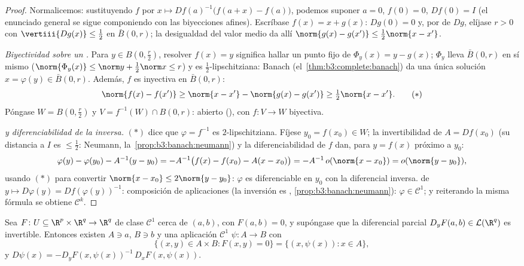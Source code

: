 \begin{proof}
Normalicemos: sustituyendo $f$ por $x \mapsto Df(a)^{-1}\bigl(f(a +
x) - f(a)\bigr)$, podemos suponer $a = 0$, $f(0) = 0$, $Df(0) =
I$ (el enunciado general se sigue componiendo con las biyecciones
afines). Escríbase $f(x) = x + g(x)$: $Dg(0) = 0$ y, por
 de $Dg$, elíjase
$r > 0$ con $\vertiii{Dg(x)} \leq \frac12$ en $\bar B(0, r)$; la
desigualdad del valor medio da allí $\norm{g(x) - g(x')} \leq \frac12
\norm{x - x'}$.

\emph{Biyectividad sobre un .}
Para $y \in B(0,
\frac r2)$, resolver $f(x) = y$ significa hallar un punto fijo de
$\Phi_y(x) = y - g(x)$; $\Phi_y$ lleva $\bar B(0, r)$ en sí mismo
($\norm{\Phi_y(x)} \leq \norm y + \frac12\norm x \leq
r$) y es $\frac12$-lipschitziana: Banach
(el~\cref{thm:b3:complete:banach}) da una única solución
$x = \varphi(y) \in \bar B(0,r)$. Además, $f$ es inyectiva en
$\bar B(0,r)$:
\[
\norm{f(x) - f(x')} \geq \norm{x - x'} - \norm{g(x) - g(x')}
\geq \tfrac12\norm{x - x'} .
\tag{$*$}
\]
Póngase $W = B(0, \frac r2)$ y $V = f^{-1}(W)\cap B(0, r)$: abierto
(), con
$f \colon V \to W$ biyectiva.

\emph{ y
diferenciabilidad de la inversa.} $(*)$ dice que $\varphi = f^{-1}$ es
$2$-lipschitziana. Fíjese $y_0 = f(x_0)
\in W$; la invertibilidad de $A = Df(x_0)$ (su distancia a $I$ es
$\leq \frac12$: Neumann, la~\cref{prop:b3:banach:neumann}) y la
diferenciabilidad de $f$ dan, para $y = f(x)$ próximo a $y_0$:
\[
\varphi(y) - \varphi(y_0) - A^{-1}(y - y_0)
= -A^{-1}\bigl(f(x) - f(x_0) - A(x - x_0)\bigr)
= -A^{-1}\,o(\norm{x - x_0}) = o(\norm{y - y_0}),
\]
usando $(*)$ para convertir $\norm{x - x_0} \leq 2\norm{y - y_0}$:
$\varphi$ es diferenciable en $y_0$ con la diferencial inversa.
 de
$y \mapsto D\varphi(y) =
Df(\varphi(y))^{-1}$: composición de
aplicaciones  (la
inversión es ,
\cref{prop:b3:banach:neumann}): $\varphi \in \mathcal C^1$;
y reiterando la misma fórmula se obtiene $\mathcal C^k$.
\end{proof}

\begin{theorem}
\label{thm:b3:submanifolds:implicit}
Sea $F \colon U \subseteq \R^p\times\R^q \to \R^q$ de clase
$\mathcal C^1$ cerca de $(a, b)$, con $F(a,b) = 0$, y supóngase que la
diferencial parcial $D_yF(a,b) \in \mathcal L(\R^q)$ es invertible.
Entonces existen  $A \ni a$,
$B \ni b$ y una aplicación $\mathcal C^1$ $\psi \colon A \to B$ con
\[
\bigl\{(x, y)\in A\times B : F(x,y) = 0\bigr\}
= \{(x, \psi(x)) : x \in A\},
\]
y $D\psi(x) = -D_yF(x, \psi(x))^{-1}\,D_xF(x,
\psi(x))$.
\end{theorem}

